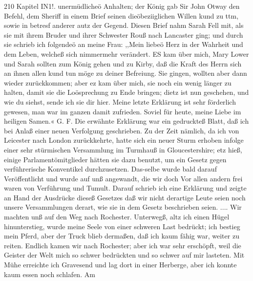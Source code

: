 210 Kapitel IN1!.
unermüdlicheö Anhalten; der König gab Sir John Otway den
Befehl, dem Sheriff in einem Brief seinen dieöbeziiglichen Willen
kund zu ttm, sowie in betresf anderer autz der Gegend. Diesen
Brief nahm Sarah Fell mit, als sie mit ihrem Bruder und ihrer
Schwester Rouß nach Lancaster ging; und durch sie schrieb ich
folgendeö an meine Frau:
,,Mein liebeö Herz in der Wahrheit und dem Leben, welcheß
sich nimmermehr verändert.
ES kam über mich, Mary Lower und Sarah sollten zum
König gehen und zu Kirby, daß die Kraft des Herrn sich an
ihnen allen kund tun möge zu deiner Befreiung. Sie gingen,
wollten aber dann wieder zurückkommen; aber ez kam über mich,
sie noch ein wenig länger zu halten, damit sie die Loösprechung
zu Ende bringen; dietz ist nun geschehen, und wie du siehst, sende
ich sie dir hier. Meine letzte Erklärung ist sehr förderlich gewesen,
man war im ganzen damit zufrieden. Soviel für heute, meine
Liebe im heiligen Samen.«
G. F.
Die erwähnte Erklärung war ein gedruckteß Blatt, daß ich
bei Anlaß einer neuen Verfolgung geschrieben. Zu der Zeit
nämlich, da ich von Leicester nach London zurückkehrte, hatte
sich ein neuer Sturm erhoben infolge einer sehr stürmischen
Versammlung im Turmhauß in Gloucestershire; etz hieß, einige
Parlamentömitglieder hätten sie dazu benutzt, um ein Gesetz gegen
verführerische Konventikel durchzusetzen. Das-selbe wurde bald
darauf Veröffentlicht und wurde auf unß angewandt, die wir doch
Vor allen andern frei waren von Verführung und Tumult. Darauf
schrieb ich eine Erklärung und zeigte an Hand der Ausdrücke
dieseß Gesetzes daß wir nicht derartige Leute seien noch
unsere Versammlungen derart, wie sie in dem Gesetz beschrieben
seien. ....
Wir machten unß auf den Weg nach Rochester. Unterwegß,
altz ich einen Hügel hinunterstieg, wurde meine Seele von einer
schweren Last bedrückt; ich bestieg mein Pferd, aber der Truck
blieb dermaßen, daß ich kaum fähig war, weiter zu reiten. Endlich
kamen wir nach Rochester; aber ich war sehr erschöpft, weil die
Geister der Welt mich so schwer bedrückten und so schwer auf
mir lasteten. Mit Mühe erreichte ich Gravesend und lag dort
in einer Herberge, aber ich konnte kaum essen noch schlafen. Am


